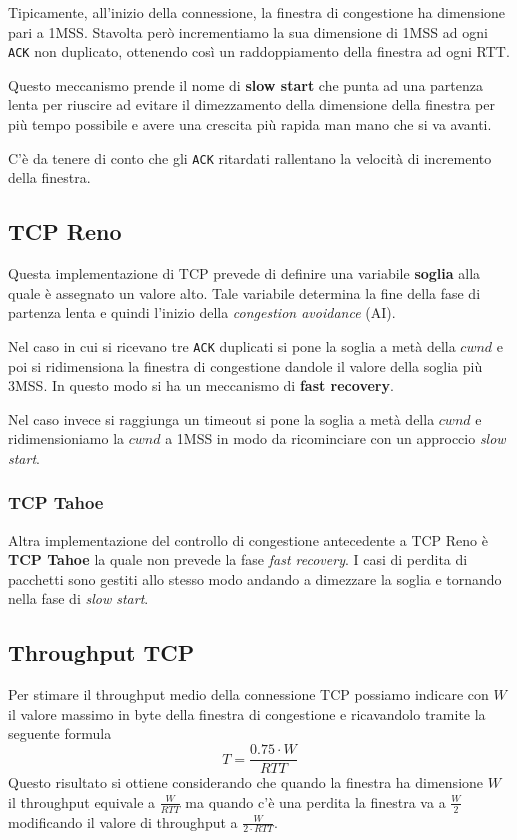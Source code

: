 Tipicamente, all'inizio della connessione, la finestra di congestione ha dimensione pari a 1MSS.
Stavolta però incrementiamo la sua dimensione di 1MSS ad ogni \verb|ACK| non duplicato, ottenendo
così un raddoppiamento della finestra ad ogni RTT.

Questo meccanismo prende il nome di \textbf{slow start} che punta ad una partenza lenta per 
riuscire ad evitare il dimezzamento della dimensione della finestra per più tempo possibile e
avere una crescita più rapida man mano che si va avanti.

C'è da tenere di conto che gli \verb|ACK| ritardati rallentano la velocità di incremento della
finestra.

\subsection{TCP Reno}
Questa implementazione di TCP prevede di definire una variabile \textbf{soglia} alla quale è 
assegnato un valore alto. Tale variabile determina la fine della fase di partenza lenta e quindi 
l'inizio della \emph{congestion avoidance} (AI).

Nel caso in cui si ricevano tre \verb|ACK| duplicati si pone la soglia a metà della $cwnd$ e poi
si ridimensiona la finestra di congestione dandole il valore della soglia più 3MSS. In questo modo
si ha un meccanismo di \textbf{fast recovery}.

Nel caso invece si raggiunga un timeout si pone la soglia a metà della $cwnd$ e ridimensioniamo la
$cwnd$ a 1MSS in modo da ricominciare con un approccio \emph{slow start}.

\subsubsection{TCP Tahoe}
Altra implementazione del controllo di congestione antecedente a TCP Reno è \textbf{TCP Tahoe} la
quale non prevede la fase \emph{fast recovery}. I casi di perdita di pacchetti sono gestiti allo 
stesso modo andando a dimezzare la soglia e tornando nella fase di \emph{slow start}.

\subsection{Throughput TCP}
Per stimare il throughput medio della connessione TCP possiamo indicare con $W$ il valore massimo
in byte della finestra di congestione e ricavandolo tramite la seguente formula
\[ T = \frac{0.75 \cdot W}{RTT} \]
Questo risultato si ottiene considerando che quando la finestra ha dimensione $W$ il throughput 
equivale a $\frac{W}{RTT}$ ma quando c'è una perdita la finestra va a $\frac{W}{2}$ modificando il
valore di throughput a $\frac{W}{2 \cdot RTT}$.


